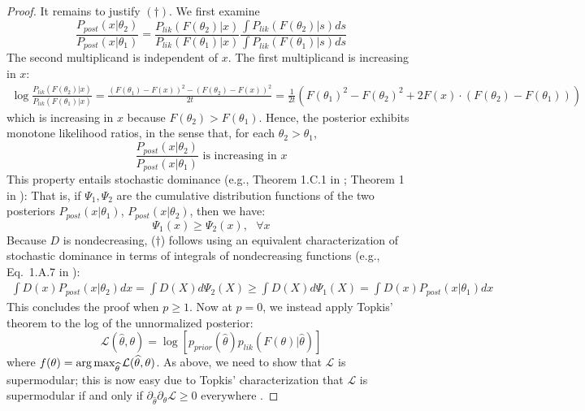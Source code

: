 \begin{proof}
It remains to justify $(\dagger)$.
We first examine
\begin{equation}
    \frac{P_{post}(x|\theta_2)}{P_{post}(x|\theta_1)} = \frac{P_{lik}(F(\theta_2)|x)}{P_{lik}(F(\theta_1)|x)} \frac{\int P_{lik}(F(\theta_2)|s)ds}{\int P_{lik}(F(\theta_1)|s)ds} 
\end{equation}
The second multiplicand is independent of $x$. The first multiplicand is increasing in $x$:
\begin{align*}
   \log \frac{P_{lik}(F(\theta_2)|x)}{P_{lik}(F(\theta_1)|x)} = \frac{(F(\theta_1)-F(x))^2 - (F(\theta_2)-F(x))^2}{2t} = \frac{1}{2t} \left(F(\theta_1)^2 - F(\theta_2)^2 + 2F(x) \cdot (F(\theta_2)-F(\theta_1))  \right)
\end{align*}
which is increasing in $x$ because $F(\theta_2) > F(\theta_1)$.
Hence, the posterior exhibits monotone likelihood ratios, in the sense that, for each $\theta_2>\theta_1$,
\begin{equation}
    \frac{P_{post}(x|\theta_2)}{P_{post}(x|\theta_1)}\text{ is increasing in $x$}
\end{equation}
This property  entails stochastic dominance (e.g., Theorem 1.C.1 in \cite{shaked2007stochastic}; Theorem 1 in \cite{lehmann1955ordered}):
That is, if $\Psi_1, \Psi_2$ are the cumulative distribution functions of the two posteriors $P_{post}(x|\theta_1)$, $P_{post}(x|\theta_2)$, then we have:
\begin{equation}
    \Psi_1(x) \geq \Psi_2(x), \ \ \ \forall x
\end{equation}
Because $D$ is nondecreasing, ($\dagger$) follows using an equivalent characterization of stochastic dominance in terms of integrals of nondecreasing functions (e.g., Eq.~1.A.7 in \cite{shaked2007stochastic}):
\begin{align*}
    \int D(x) P_{post}(x|\theta_2) dx = \int D(X) d\Psi_2(X) 
     \geq \int D(X) d\Psi_1(X) = \int D(x) P_{post}(x|\theta_1) dx 
\end{align*}
This concludes the proof when $p\geq 1$.
Now at $p=0$, we instead apply Topkis' theorem to the log of the unnormalized posterior:
\begin{equation}
    \mathcal{L}(\widehat{\theta},\theta) = \log \left[p_{prior}(\widehat{\theta}) p_{lik}(F(\theta)|\widehat{\theta})\right]
\end{equation}
where $f(\theta) = \operatorname*{arg\,max}_{\widehat{\theta}} \mathcal{L}(\widehat{\theta}, \theta)$.
As above, we need to show that $\mathcal{L}$ is supermodular; this is now easy due to Topkis' characterization that $\mathcal{L}$ is supermodular if and only if $\partial_{\widehat{\theta}}\partial_\theta \mathcal{L} \geq 0$ everywhere \citep{topkis1978minimizing, topkis1998supermodularity}.

\end{proof}
